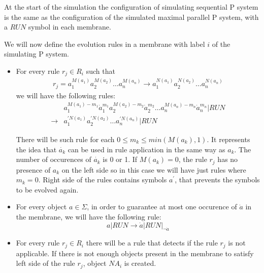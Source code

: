 \begin{dokaz}
  At the start of the simulation the configuration of simulating sequential P system is the same as the configuration of the simulated maximal parallel P system, with a $\mathit{RUN}$ symbol in each membrane.


  We will now define the evolution rules in a membrane with label $i$ of the simulating P system.

  \begin{itemize}
    \item For every rule $r_j\in R_i$ such that
      \begin{align*}
        r_j = a_1^{M(a_1)}a_2^{M(a_2)}\dots a_n^{M(a_n)} \rightarrow a_1^{N(a_1)}a_2^{N(a_2)}\dots a_n^{N(a_n)}
      \end{align*}
      we will have the following rules:
      \begin{align*}
        &a_1^{M(a_1)-m_1}\dot{a}_1^{m_1}
        a_2^{M(a_2)-m_2}\dot{a}_2^{m_2}\dots
        a_n^{M(a_n)-m_n}\dot{a}_n^{m_n}|\mathit{RUN} \\
        \rightarrow &a_1^{\prime N(a_1)}a_2^{\prime N(a_2)}\dots a_n^{\prime N(a_n)}|\mathit{RUN}
      \end{align*}
      
      There will be such rule for each $0\leq m_k\leq min(M(a_k),1)$. It represents the idea that $\dot{a_k}$ can be used in rule application in the same way as $a_k$. The number of occurences of $\dot{a_k}$ is 0 or 1. If $M(a_k) = 0$, the rule $r_j$ has no presence of $a_k$ on the left side so in this case we will have just rules where $m_k=0$. Right side of the rules contains symbols $a^\prime$, that prevents the symbols to be evolved again.

    \item For every object $a\in\Sigma$, in order to guarantee at most one occurence of $\dot{a}$ in the membrane, we will have the following rule:
    $$a|\mathit{RUN} \rightarrow \dot{a}|\mathit{RUN}|_{\neg \dot{a}}$$

    \item For every rule $r_j\in R_i$ there will be a rule that detects if the rule $r_j$ is not applicable. If there is not enough objects present in the membrane to satisfy left side of the rule $r_j$, object $\mathit{NA_i}$ is created.


\end{itemize}
\end{dokaz}
